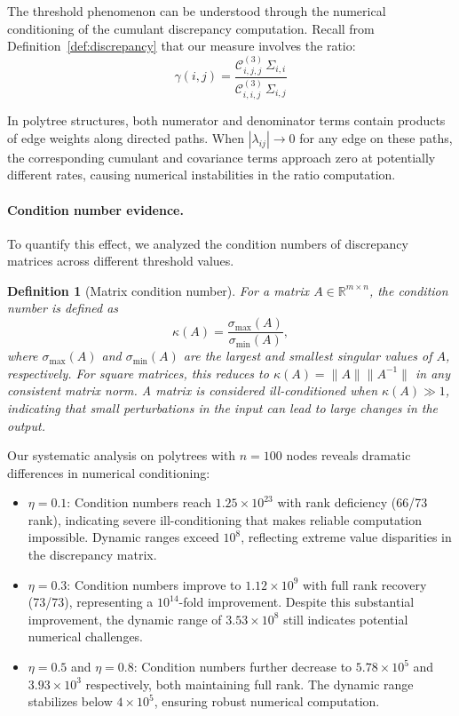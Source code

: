 \documentclass[11pt,a4paper]{article}
\numberwithin{equation}{section}
\newtheorem{definition}[theorem]{Definition}
\begin{document}
The threshold phenomenon can be understood through the numerical conditioning of the cumulant discrepancy computation. Recall from Definition~\ref{def:discrepancy} that our measure involves the ratio:
\begin{equation}
\gamma(i,j) = \frac{\mathcal{C}^{(3)}_{i,j,j} \, \Sigma_{i,i}}{\mathcal{C}^{(3)}_{i,i,j} \, \Sigma_{i,j}}
\end{equation}

In polytree structures, both numerator and denominator terms contain products of edge weights along directed paths. When $|\lambda_{ij}| \to 0$ for any edge on these paths, the corresponding cumulant and covariance terms approach zero at potentially different rates, causing numerical instabilities in the ratio computation.


\paragraph{Condition number evidence.} To quantify this effect, we analyzed the condition numbers of discrepancy matrices across different threshold values. 

\begin{definition}[Matrix condition number]
For a matrix $A \in \mathbb{R}^{m \times n}$, the condition number is defined as
\begin{equation}
\kappa(A) = \frac{\sigma_{\max}(A)}{\sigma_{\min}(A)},
\end{equation}
where $\sigma_{\max}(A)$ and $\sigma_{\min}(A)$ are the largest and smallest singular values of $A$, respectively. For square matrices, this reduces to $\kappa(A) = \|A\| \|A^{-1}\|$ in any consistent matrix norm. A matrix is considered ill-conditioned when $\kappa(A) \gg 1$, indicating that small perturbations in the input can lead to large changes in the output.
\end{definition}

Our systematic analysis on polytrees with $n = 100$ nodes reveals dramatic differences in numerical conditioning:

\begin{itemize}
\item $\eta = 0.1$: Condition numbers reach $1.25 \times 10^{23}$ with rank deficiency (66/73 rank), indicating severe ill-conditioning that makes reliable computation impossible. Dynamic ranges exceed $10^8$, reflecting extreme value disparities in the discrepancy matrix.

\item $\eta = 0.3$: Condition numbers improve to $1.12 \times 10^9$ with full rank recovery (73/73), representing a $10^{14}$-fold improvement. Despite this substantial improvement, the dynamic range of $3.53 \times 10^8$ still indicates potential numerical challenges.

\item $\eta = 0.5$ and $\eta = 0.8$: Condition numbers further decrease to $5.78 \times 10^5$ and $3.93 \times 10^3$ respectively, both maintaining full rank. The dynamic range stabilizes below $4 \times 10^5$, ensuring robust numerical computation.
\end{itemize}
\end{document}
